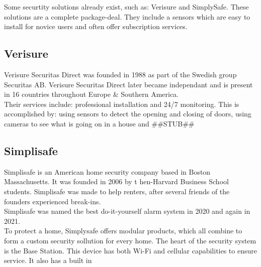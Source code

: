 Some securtity solutions already exist, such as: Verisure and SimplySafe.
These solutions are a complete package-deal. 
They include a sensors which are easy to install for novice users and often offer subscription services.
\subsection{Verisure}
Verisure Securitas Direct was founded in 1988 as part of the Swedish group Securitas AB. 
Verisure Securitas Direct later became independant and is present in 16 countries throughout Europe \& Southern America.
\\
Their services include: professional installation and 24/7 monitoring. This is accomplished by: 
using sensors to detect the opening and closing of doors, 
using cameras to see what is going on in a house and ##STUB##

\subsection{Simplisafe}
Simplisafe is an American home security company based in Boston Massachusetts. 
It was founded in 2006 by t hen-Harvard Business School students.
Simplisafe was made to help renters, after several friends of the founders experienced break-ins.
\\
Simplisafe was named the best do-it-yourself alarm system in 2020 and again in 2021.
\\
To protect a home, Simplysafe offers modular products, which all combine to form a custom security sollution for every home.
The heart of the security system is the Base Station. This device has both Wi-Fi and cellular capabilities to ensure service.
It also has a built in 

